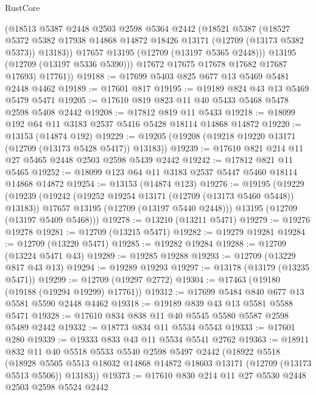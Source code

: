 \begin{lexlean}{RustCore}
\begin{coremodule}
            (@18513
              @5387
              @2448
              @2503
              @2598
              @5364
              @2442
              (@18521
                @5387
                (@18527
                  @5372
                  @5382
                  @17938
                  @14868
                  @14872
                  @18426
                  @13171
                  (@12709 (@13173 @5382 @5373))
                  @13183))
              @17657
              @13195
              (@12709 (@13197 @5365 @2448)))
            @13195
            (@12709 (@13197 @5336 @5390)))
          @17672
          @17675
          @17678
          @17682
          @17687
          @17693)
        @17761))
@19188 := @17699 @5403 @825 @677 @13 @5469 @5481 @2448 @4462
@19189 := @17601 @817
@19195 := @19189 @824 @43 @13 @5469 @5479 @5471
@19205 := @17610 @819 @823 @11 @40 @5433 @5468 @5478 @2598 @5408 @2442
@19208 := @17812 @819 @11 @5433
@19218 := @18099 @192 @64 @11 @3183 @2537 @5416 @5428 @18114 @14868 @14872
@19220 := @13153 (@14874 @192)
@19229 := @19205 (@19208 (@19218 @19220 @13171 (@12709 (@13173 @5428 @5417)) @13183))
@19239 := @17610 @821 @214 @11 @27 @5465 @2448 @2503 @2598 @5439 @2442
@19242 := @17812 @821 @11 @5465
@19252 := @18099 @123 @64 @11 @3183 @2537 @5447 @5460 @18114 @14868 @14872
@19254 := @13153 (@14874 @123)
@19276 := @19195
    (@19229
      (@19239
        (@19242 (@19252 @19254 @13171 (@12709 (@13173 @5460 @5448)) @13183))
        @17657
        @13195
        (@12709 (@13197 @5440 @2448)))
      @13195
      (@12709 (@13197 @5409 @5468)))
@19278 := @13210 (@13211 @5471)
@19279 := @19276 @19278
@19281 := @12709 (@13215 @5471)
@19282 := @19279 @19281
@19284 := @12709 (@13220 @5471)
@19285 := @19282 @19284
@19288 := @12709 (@13224 @5471 @43)
@19289 := @19285 @19288
@19293 := @12709 (@13229 @817 @43 @13)
@19294 := @19289 @19293
@19297 := @13178 (@13179 (@13235 @5471))
@19299 := @12709 (@19297 @2772)
@19304 := @17463 (@19180 (@19188 (@19294 @19299) @17761))
@19312 := @17699 @5484 @840 @677 @13 @5581 @5590 @2448 @4462
@19318 := @19189 @839 @43 @13 @5581 @5588 @5471
@19328 := @17610 @834 @838 @11 @40 @5545 @5580 @5587 @2598 @5489 @2442
@19332 := @18773 @834 @11 @5534 @5543
@19333 := @17601 @280
@19339 := @19333 @833 @43 @11 @5534 @5541 @2762
@19363 := @18911
    @832
    @11
    @40
    @5518
    @5533
    @5540
    @2598
    @5497
    @2442
    (@18922
      @5518
      (@18928 @5505 @5513 @18032 @14868 @14872 @18603 @13171 (@12709 (@13173 @5513 @5506)) @13183))
@19373 := @17610 @830 @214 @11 @27 @5530 @2448 @2503 @2598 @5524 @2442

\end{coremodule}
\end{lexlean}
